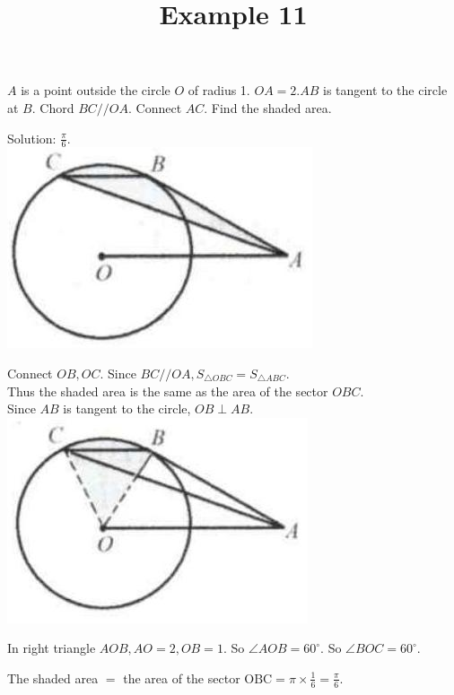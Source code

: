 \documentclass{article}
\title{Example 11}
\date{}
\begin{document}
\maketitle

\(A\) is a point outside the circle \(O\) of radius 1. \(O A=2 . A B\) is tangent to the circle at \(B\). Chord \(B C / / O A\). Connect \(A C\). Find the shaded area.

Solution: \(\frac{\pi}{6}\).\\
\centering
\includegraphics[width=\textwidth]{images/problem_image_1.jpg}

Connect \(O B, O C\). Since \(B C / / O A, S_{\triangle O B C}=S_{\triangle A B C}\).\\
Thus the shaded area is the same as the area of the sector \(O B C\).\\
Since \(A B\) is tangent to the circle, \(O B \perp A B\).\\
\centering
\includegraphics[width=\textwidth]{images/reasoning_image_1.jpg}

In right triangle \(A O B, A O=2, O B=1\). So \(\angle A O B=60^{\circ}\). So \(\angle B O C=60^{\circ}\).


The shaded area \(=\) the area of the sector \(\mathrm{OBC}=\pi \times \frac{1}{6}=\frac{\pi}{6}\).\\
\end{document}
